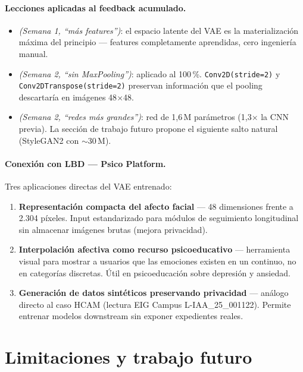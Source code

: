 \documentclass[10pt,a4paper,twocolumn]{article}
\begin{document}
\paragraph{Lecciones aplicadas al feedback acumulado.}
\begin{itemize}
    \item \textit{(Semana 1, ``más features'')}: el espacio latente del VAE es la materialización máxima del principio — features completamente aprendidas, cero ingeniería manual.
    \item \textit{(Semana 2, ``sin MaxPooling'')}: aplicado al 100\,\%. \texttt{Conv2D(stride=2)} y \texttt{Conv2DTranspose(stride=2)} preservan información que el pooling descartaría en imágenes 48$\times$48.
    \item \textit{(Semana 2, ``redes más grandes'')}: red de 1,6\,M parámetros (1,3$\times$ la CNN previa). La sección de trabajo futuro propone el siguiente salto natural (StyleGAN2 con $\sim$30\,M).
\end{itemize}

\paragraph{Conexión con LBD — Psico Platform.}

Tres aplicaciones directas del VAE entrenado:

\begin{enumerate}[label=(\alph*)]
    \item \textbf{Representación compacta del afecto facial} — 48 dimensiones frente a 2.304 píxeles. Input estandarizado para módulos de seguimiento longitudinal sin almacenar imágenes brutas (mejora privacidad).
    \item \textbf{Interpolación afectiva como recurso psicoeducativo} — herramienta visual para mostrar a usuarios que las emociones existen en un continuo, no en categorías discretas. Útil en psicoeducación sobre depresión y ansiedad.
    \item \textbf{Generación de datos sintéticos preservando privacidad} — análogo directo al caso HCAM (lectura EIG Campus L-IAA\_25\_001122). Permite entrenar modelos downstream sin exponer expedientes reales.
\end{enumerate}

\section{Limitaciones y trabajo futuro}
\end{document}

